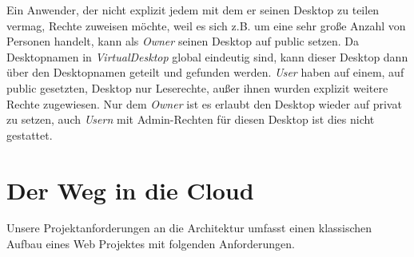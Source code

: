 \documentclass[a4paper, 12pt]{scrreprt}
\renewcommand\_{\textunderscore\allowbreak}
\begin{document}
\noindent Ein Anwender, der nicht explizit jedem mit dem er seinen Desktop zu teilen vermag, Rechte zuweisen möchte, weil es sich z.B. um eine sehr große Anzahl von Personen handelt, kann als \textit{Owner} seinen Desktop auf public setzen.
Da Desktopnamen in \textit{VirtualDesktop} global eindeutig sind, kann dieser Desktop dann über den Desktopnamen geteilt und gefunden werden.
\textit{User} haben auf einem, auf public gesetzten, Desktop nur Leserechte, außer ihnen wurden explizit weitere Rechte zugewiesen. 
Nur dem \textit{Owner} ist es erlaubt den Desktop wieder auf privat zu setzen, auch \textit{Usern} mit Admin-Rechten für diesen Desktop ist dies nicht gestattet.

\chapter{Der Weg in die Cloud}
Unsere Projektanforderungen an die Architektur umfasst einen klassischen Aufbau eines Web Projektes mit folgenden Anforderungen. \\
\end{document}
